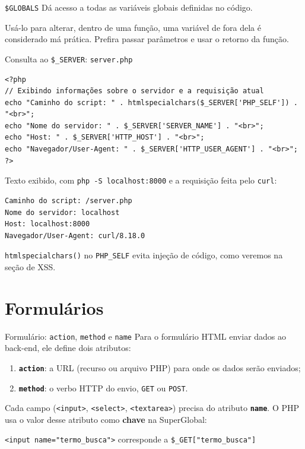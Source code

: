 \documentclass{beamer}
\begin{document}
\begin{frame}{\texttt{\$GLOBALS}}
	Dá acesso a todas as variáveis globais definidas no código.

	\vspace{0.3cm}
	Usá-lo para alterar, dentro de uma função, uma variável de fora dela é
	considerado má prática. Prefira passar parâmetros e usar o retorno da
	função.
\end{frame}

\begin{frame}[fragile]{Consulta ao \texttt{\$\_SERVER}: \texttt{server.php}}
	\begin{verbatim}
<?php
// Exibindo informações sobre o servidor e a requisição atual
echo "Caminho do script: " . htmlspecialchars($_SERVER['PHP_SELF']) . "<br>";
echo "Nome do servidor: " . $_SERVER['SERVER_NAME'] . "<br>";
echo "Host: " . $_SERVER['HTTP_HOST'] . "<br>";
echo "Navegador/User-Agent: " . $_SERVER['HTTP_USER_AGENT'] . "<br>";
?>
	\end{verbatim}

	Texto exibido, com \texttt{php -S localhost:8000} e a requisição feita pelo \texttt{curl}:

	\begin{verbatim}
Caminho do script: /server.php
Nome do servidor: localhost
Host: localhost:8000
Navegador/User-Agent: curl/8.18.0
	\end{verbatim}

	\texttt{htmlspecialchars()} no \texttt{PHP\_SELF} evita injeção de código,
	como veremos na seção de XSS.
\end{frame}

\section{Formulários}

\begin{frame}{Formulário: \texttt{action}, \texttt{method} e \texttt{name}}
	Para o formulário HTML enviar dados ao back-end, ele define dois atributos:

	\begin{enumerate}
		\item \textbf{\texttt{action}}: a URL (recurso ou arquivo PHP) para onde
		      os dados serão enviados;
		\item \textbf{\texttt{method}}: o verbo HTTP do envio, \texttt{GET} ou
		      \texttt{POST}.
	\end{enumerate}

	\vspace{0.3cm}
	Cada campo (\texttt{<input>}, \texttt{<select>}, \texttt{<textarea>})
	precisa do atributo \textbf{\texttt{name}}. O PHP usa o valor desse
	atributo como \textbf{chave} na SuperGlobal:

	\vspace{0.2cm}
	\begin{center}
		\texttt{<input name="termo\_busca">} \quad corresponde a \quad
		\texttt{\$\_GET["termo\_busca"]}
	\end{center}
\end{frame}
\end{document}
